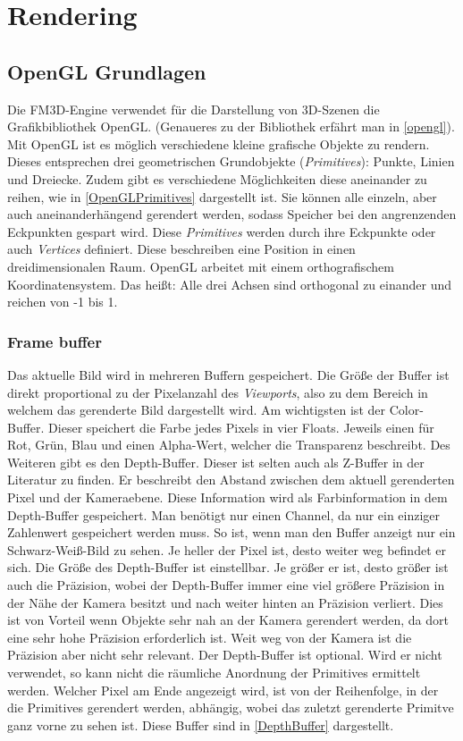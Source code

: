 \section[Rendering]{Rendering\cite{GLReference, OglDev, ThinMatrix, SparkyEngine, GLTut}}
\label{rendering}
\subsection{OpenGL Grundlagen}

Die FM3D-Engine verwendet für die Darstellung von 3D-Szenen die Grafikbibliothek OpenGL. (Genaueres zu der Bibliothek erfährt man in \cref{opengl}). Mit OpenGL ist es möglich verschiedene kleine grafische Objekte zu rendern. Dieses entsprechen drei geometrischen Grundobjekte (\textit{Primitives}): Punkte, Linien und Dreiecke. Zudem gibt es verschiedene Möglichkeiten diese aneinander zu reihen, wie in \cref{OpenGLPrimitives} dargestellt ist. Sie können alle einzeln, aber auch aneinanderhängend gerendert werden, sodass Speicher bei den angrenzenden Eckpunkten gespart wird. Diese \textit{Primitives} werden durch ihre Eckpunkte oder auch \textit{Vertices} definiert. Diese beschreiben eine Position in einen dreidimensionalen Raum. OpenGL arbeitet mit einem orthografischem Koordinatensystem. Das heißt: Alle drei Achsen sind orthogonal zu einander und reichen von -1 bis 1.

\subsubsection{Frame buffer}
Das aktuelle Bild wird in mehreren Buffern gespeichert. Die Größe der Buffer ist direkt proportional zu der Pixelanzahl des \textit{Viewports}, also zu dem Bereich in welchem das gerenderte Bild dargestellt wird. Am wichtigsten ist der Color-Buffer. Dieser speichert die Farbe jedes Pixels in vier Floats. Jeweils einen für Rot, Grün, Blau und einen Alpha-Wert, welcher die Transparenz beschreibt. Des Weiteren gibt es den Depth-Buffer. Dieser ist selten auch als Z-Buffer in der Literatur zu finden. Er beschreibt den Abstand zwischen dem aktuell gerenderten Pixel und der Kameraebene. Diese Information wird als Farbinformation in dem Depth-Buffer gespeichert. 
Man benötigt nur einen Channel, da nur ein einziger Zahlenwert gespeichert werden muss. So ist, wenn man den Buffer anzeigt nur ein Schwarz-Weiß-Bild zu sehen. Je heller der Pixel ist, desto weiter weg befindet er sich. Die Größe des Depth-Buffer ist einstellbar. Je größer er ist, desto größer ist auch die Präzision, wobei der Depth-Buffer immer eine viel größere Präzision in der Nähe der Kamera besitzt und nach weiter hinten an Präzision verliert. Dies ist von Vorteil wenn Objekte sehr nah an der Kamera gerendert werden, da dort eine sehr hohe Präzision erforderlich ist. Weit weg von der Kamera ist die Präzision aber nicht sehr relevant. Der Depth-Buffer ist optional. Wird er nicht verwendet, so kann nicht die räumliche Anordnung der Primitives ermittelt werden. Welcher Pixel am Ende angezeigt wird, ist von der Reihenfolge, in der die Primitives gerendert werden, abhängig, wobei das zuletzt gerenderte Primitve ganz vorne zu sehen ist. Diese Buffer sind in \cref{DepthBuffer} dargestellt. 

